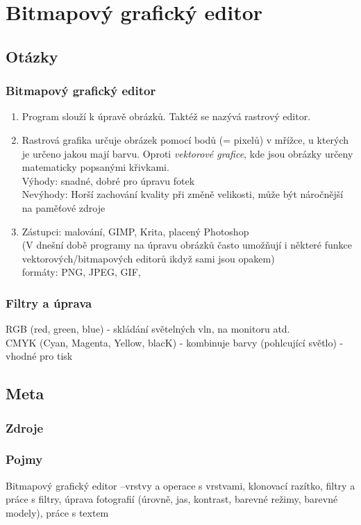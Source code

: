 \documentclass[12pt]{article}
\begin{document}
\section{Bitmapový grafický editor}
\subsection{Otázky}
\subsubsection{Bitmapový grafický editor}
\begin{enumerate}
\item Program slouží k úpravě obrázků. Taktéž se nazývá rastrový editor.
\item Rastrová grafika určuje obrázek pomocí bodů (= pixelů) v mřížce, u kterých je určeno jakou mají barvu. Oproti \emph{vektorové grafice}, kde jsou obrázky určeny matematicky  popsanými křivkami.\\
Výhody: snadné, dobré pro úpravu fotek\\
Nevýhody: Horší zachování kvality při změně velikosti, může být náročnější na paměťové zdroje
\item Zástupci: malování, GIMP, Krita, placený Photoshop\\
(V dnešní době programy na úpravu obrázků často umožňují i některé funkce vektorových/bitmapových editorů ikdyž sami jsou opakem)\\
formáty: PNG, JPEG, GIF,
\end{enumerate}
\subsubsection{Filtry a úprava}
RGB (red, green, blue) - skládání světelných vln, na monitoru atd.\\
CMYK (Cyan, Magenta, Yellow, blacK) - kombinuje barvy (pohlcující světlo) - vhodné pro tisk		
\subsection{Meta}
\subsubsection{Zdroje}
\subsubsection{Pojmy}
Bitmapový grafický editor –vrstvy a operace s vrstvami, klonovací razítko, filtry a práce s filtry, úprava fotografií (úrovně, jas, kontrast, barevné režimy, barevné modely), práce s textem
\end{document}
